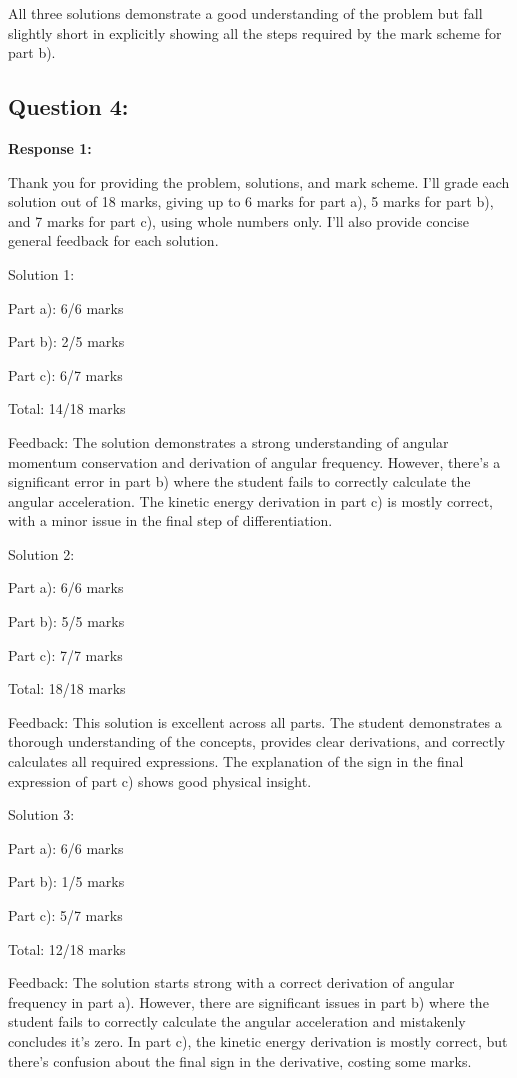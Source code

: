 \documentclass[a4paper,11pt]{article}
\begin{document}
All three solutions demonstrate a good understanding of the problem but fall slightly short in explicitly showing all the steps required by the mark scheme for part b).

\subsection*{Question 4:}

\textbf{Response 1:}

Thank you for providing the problem, solutions, and mark scheme. I'll grade each solution out of 18 marks, giving up to 6 marks for part a), 5 marks for part b), and 7 marks for part c), using whole numbers only. I'll also provide concise general feedback for each solution.

Solution 1:

Part a): 6/6 marks

Part b): 2/5 marks

Part c): 6/7 marks

Total: 14/18 marks

Feedback: The solution demonstrates a strong understanding of angular momentum conservation and derivation of angular frequency. However, there's a significant error in part b) where the student fails to correctly calculate the angular acceleration. The kinetic energy derivation in part c) is mostly correct, with a minor issue in the final step of differentiation.

Solution 2:

Part a): 6/6 marks

Part b): 5/5 marks

Part c): 7/7 marks

Total: 18/18 marks

Feedback: This solution is excellent across all parts. The student demonstrates a thorough understanding of the concepts, provides clear derivations, and correctly calculates all required expressions. The explanation of the sign in the final expression of part c) shows good physical insight.

Solution 3:

Part a): 6/6 marks

Part b): 1/5 marks

Part c): 5/7 marks

Total: 12/18 marks

Feedback: The solution starts strong with a correct derivation of angular frequency in part a). However, there are significant issues in part b) where the student fails to correctly calculate the angular acceleration and mistakenly concludes it's zero. In part c), the kinetic energy derivation is mostly correct, but there's confusion about the final sign in the derivative, costing some marks.
\end{document}
